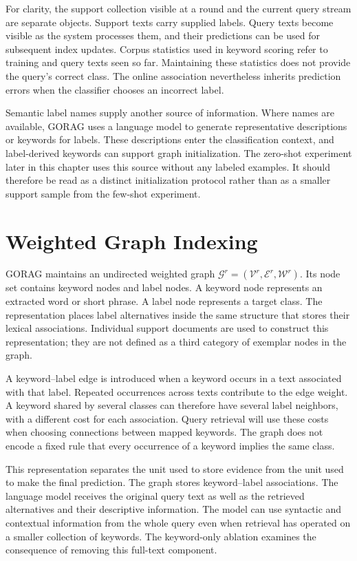 For clarity, the support collection visible at a round and the current query stream are separate objects. Support texts carry supplied labels. Query texts become visible as the system processes them, and their predictions can be used for subsequent index updates. Corpus statistics used in keyword scoring refer to training and query texts seen so far. Maintaining these statistics does not provide the query's correct class. The online association nevertheless inherits prediction errors when the classifier chooses an incorrect label.

Semantic label names supply another source of information. Where names are available, GORAG uses a language model to generate representative descriptions or keywords for labels. These descriptions enter the classification context, and label-derived keywords can support graph initialization. The zero-shot experiment later in this chapter uses this source without any labeled examples. It should therefore be read as a distinct initialization protocol rather than as a smaller support sample from the few-shot experiment.

\section{Weighted Graph Indexing}
\label{sec:gorag:indexing}

GORAG maintains an undirected weighted graph $\mathcal{G}^r=(\mathcal{V}^r,\mathcal{E}^r,\mathcal{W}^r)$. Its node set contains keyword nodes and label nodes. A keyword node represents an extracted word or short phrase. A label node represents a target class. The representation places label alternatives inside the same structure that stores their lexical associations. Individual support documents are used to construct this representation; they are not defined as a third category of exemplar nodes in the graph.

A keyword--label edge is introduced when a keyword occurs in a text associated with that label. Repeated occurrences across texts contribute to the edge weight. A keyword shared by several classes can therefore have several label neighbors, with a different cost for each association. Query retrieval will use these costs when choosing connections between mapped keywords. The graph does not encode a fixed rule that every occurrence of a keyword implies the same class.

This representation separates the unit used to store evidence from the unit used to make the final prediction. The graph stores keyword--label associations. The language model receives the original query text as well as the retrieved alternatives and their descriptive information. The model can use syntactic and contextual information from the whole query even when retrieval has operated on a smaller collection of keywords. The keyword-only ablation examines the consequence of removing this full-text component.


